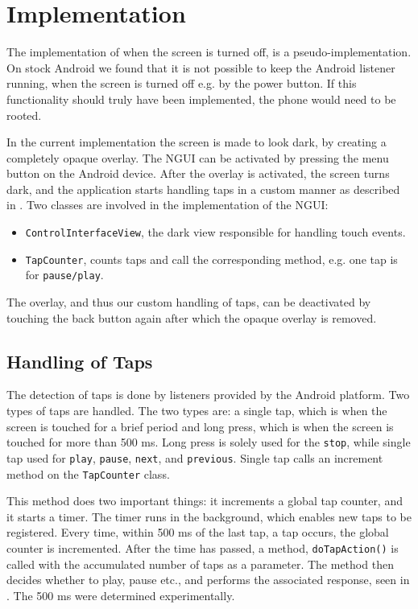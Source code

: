 \section{Implementation}
The implementation of when the screen is turned off, is a pseudo-implementation. On stock Android we found that it is not possible to keep the Android listener running, when the screen is turned off e.g. by the power button. If this functionality should truly have been implemented, the phone would need to be rooted. 

In the current implementation the screen is made to look dark, by creating a completely opaque overlay. The NGUI can be activated by pressing the menu button on the Android device. After the overlay is activated, the screen turns dark, and the application starts handling taps in a custom manner as described in . Two classes are involved in the implementation of the NGUI: 
\begin{itemize}
\item \texttt{ControlInterfaceView}, the dark view responsible for handling touch events.
\item \texttt{TapCounter}, counts taps and call the corresponding method, e.g. one tap is for \texttt{pause/play}.
\end{itemize}


The overlay, and thus our custom handling of taps, can be deactivated by touching the back button again after which the opaque overlay is removed.

\subsection{Handling of Taps}\label{subsec:handleTaps}
The detection of taps is done by listeners provided by the Android platform. Two types of taps are handled. The two types are: a single tap, which is when the screen is touched for a brief period and long press, which is when the screen is touched for more than 500 ms. Long press is solely used for the \texttt{stop}, while single tap used for \texttt{play}, \texttt{pause}, \texttt{next}, and \texttt{previous}. Single tap calls an increment method on the \texttt{TapCounter} class.

This method does two important things: it increments a global tap counter, and it starts a timer. The timer runs in the background, which enables new taps to be registered. Every time, within 500 ms of the last tap, a tap occurs, the global counter is incremented. After the time has passed, a method, \texttt{doTapAction()} is called with the accumulated number of taps as a parameter. The method then decides whether to play, pause etc., and performs the associated response, seen in . The 500 ms were determined experimentally.

